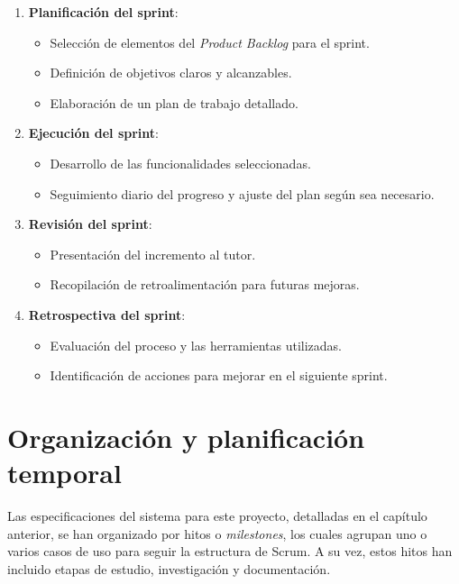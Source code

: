 \begin{enumerate} 
	\item \textbf{Planificación del sprint}: 
		\begin{itemize} 
			\item Selección de elementos del \textit{Product Backlog} para el sprint. \item Definición de objetivos claros y alcanzables. 
			\item Elaboración de un plan de trabajo detallado. \end{itemize}
	
	\item \textbf{Ejecución del sprint}: 
	\begin{itemize} 
		\item Desarrollo de las funcionalidades seleccionadas.
		\item Seguimiento diario del progreso y ajuste del plan según sea necesario.
	\end{itemize} 
	
	\item \textbf{Revisión del sprint}: 
	\begin{itemize} 
		\item Presentación del incremento al tutor.
		\item Recopilación de retroalimentación para futuras mejoras.
	\end{itemize} 
	
	\item \textbf{Retrospectiva del sprint}: 
	\begin{itemize} 
		\item Evaluación del proceso y las herramientas utilizadas.
		\item Identificación de acciones para mejorar en el siguiente sprint.
	\end{itemize} 
	
\end{enumerate}



\section{Organización y planificación temporal}
Las especificaciones del sistema para este proyecto, detalladas en el capítulo anterior, se han organizado por hitos o \textit{milestones}, los cuales agrupan uno o varios casos de uso para seguir la estructura de Scrum. A su vez, estos hitos han incluido etapas de estudio, investigación y documentación.

